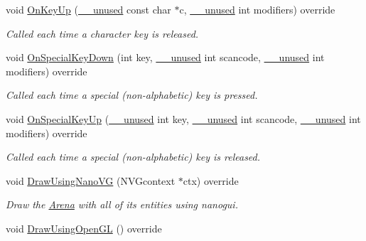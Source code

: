 \begin{DoxyCompactItemize}
void \hyperlink{classGraphicsArenaViewer_ac3e749f6a75bdd5b32d23c9c8913f9d8}{On\+Key\+Up} (\hyperlink{common_8h_a2e3484535ee610c8e19e9859563abe48}{\+\_\+\+\_\+unused} const char $\ast$c, \hyperlink{common_8h_a2e3484535ee610c8e19e9859563abe48}{\+\_\+\+\_\+unused} int modifiers) override
\begin{DoxyCompactList}\small\item\em Called each time a character key is released. \end{DoxyCompactList}\item 
void \hyperlink{classGraphicsArenaViewer_ab6ed6287ddf72f43f605482ce77b01a2}{On\+Special\+Key\+Down} (int key, \hyperlink{common_8h_a2e3484535ee610c8e19e9859563abe48}{\+\_\+\+\_\+unused} int scancode, \hyperlink{common_8h_a2e3484535ee610c8e19e9859563abe48}{\+\_\+\+\_\+unused} int modifiers) override
\begin{DoxyCompactList}\small\item\em Called each time a special (non-\/alphabetic) key is pressed. \end{DoxyCompactList}\item 
void \hyperlink{classGraphicsArenaViewer_a086e2e29e1a5745a8ee4f12996897b22}{On\+Special\+Key\+Up} (\hyperlink{common_8h_a2e3484535ee610c8e19e9859563abe48}{\+\_\+\+\_\+unused} int key, \hyperlink{common_8h_a2e3484535ee610c8e19e9859563abe48}{\+\_\+\+\_\+unused} int scancode, \hyperlink{common_8h_a2e3484535ee610c8e19e9859563abe48}{\+\_\+\+\_\+unused} int modifiers) override
\begin{DoxyCompactList}\small\item\em Called each time a special (non-\/alphabetic) key is released. \end{DoxyCompactList}\item 
void \hyperlink{classGraphicsArenaViewer_a7d59755e3f7674f382127fe135492eeb}{Draw\+Using\+Nano\+VG} (N\+V\+Gcontext $\ast$ctx) override
\begin{DoxyCompactList}\small\item\em Draw the \hyperlink{classArena}{Arena} with all of its entities using {\ttfamily nanogui}. \end{DoxyCompactList}\item 
void \hyperlink{classGraphicsArenaViewer_af894508bfa039199c6ff7f1b5a7da158}{Draw\+Using\+Open\+GL} () override\hypertarget{classGraphicsArenaViewer_af894508bfa039199c6ff7f1b5a7da158}{}\label{classGraphicsArenaViewer_af894508bfa039199c6ff7f1b5a7da158}


\end{DoxyCompactItemize}
